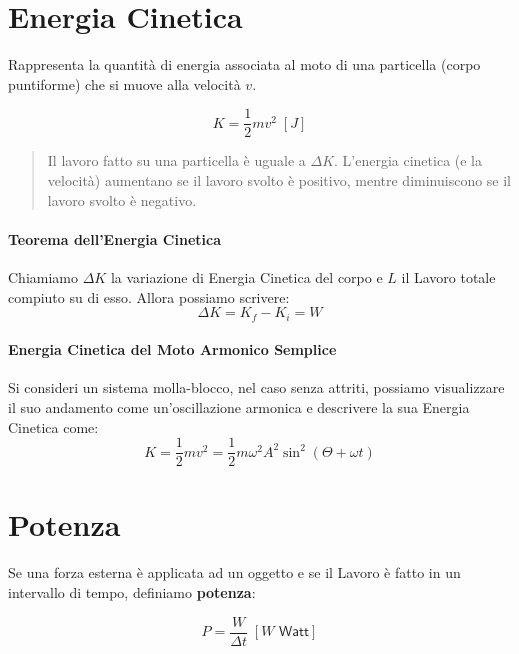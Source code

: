     \section{Energia Cinetica} Rappresenta la quantità di energia associata al 
        moto di una particella (corpo puntiforme) che si muove alla velocità $v$.

        \begin{equation}
            K = \frac{1}{2}mv^2 \; [J]
        \end{equation}

        \begin{quote}
            Il lavoro fatto su una particella è uguale a $\Delta K$. L'energia 
            cinetica (e la velocità) aumentano se il lavoro svolto è positivo, 
            mentre diminuiscono se il lavoro svolto è negativo.
        \end{quote}

        \paragraph{Teorema dell'Energia Cinetica} Chiamiamo $\Delta K$ la 
        variazione di Energia Cinetica del corpo e $L$ il Lavoro totale compiuto
        su di esso. Allora possiamo scrivere:
        \begin{equation}
            \Delta K = K_f - K_i = W
        \end{equation}

        \paragraph{Energia Cinetica del Moto Armonico Semplice} Si consideri un
        sistema molla-blocco, nel caso senza attriti, possiamo visualizzare il 
        suo andamento come un'oscillazione armonica e descrivere la sua Energia
        Cinetica come:
        \begin{equation}
            K = \frac{1}{2}mv^2 = \frac{1}{2}m\omega^2A^2\sin^2
            (\Theta + \omega t)
        \end{equation}

    
    \section{Potenza} Se una forza esterna è applicata ad un oggetto e se il 
    Lavoro è fatto in un intervallo di tempo, definiamo \textbf{potenza}:
        
        \begin{equation}
            P = \frac{W}{\Delta t} \; [W \textsf{  Watt}]
        \end{equation}

